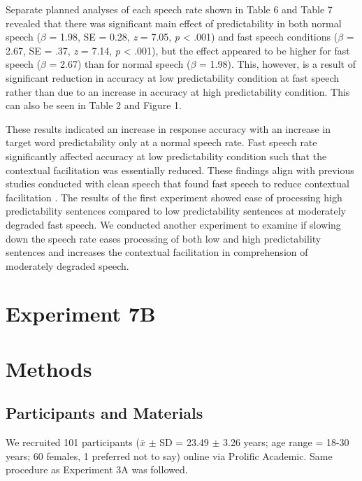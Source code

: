 \documentclass[a4paper, nobind]{templates/ociamthesis}
\begin{document}
Separate planned analyses of each speech rate shown in Table 6 and Table 7 revealed that there was significant main effect of predictability in both normal speech (\(\beta\) = 1.98, SE = 0.28, \emph{z} = 7.05, \emph{p} \textless{} .001) and fast speech conditions (\(\beta\) = 2.67, SE = .37, \emph{z} = 7.14, \emph{p} \textless{} .001),
but the effect appeared to be higher for fast speech (\(\beta\) = 2.67) than for normal speech (\(\beta\) = 1.98).
This, however, is a result of significant reduction in accuracy at low predictability condition at fast speech rather than due to an increase in accuracy at high predictability condition. This can also be seen in Table 2 and Figure 1.

These results indicated an increase in response accuracy with an increase in target word predictability only at a normal speech rate.
Fast speech rate significantly affected accuracy at low predictability condition such that the contextual facilitation was essentially reduced.
These findings align with previous studies conducted with clean speech that found fast speech to reduce contextual facilitation \autocite[e.g.,][]{Aydelott2004}.
The results of the first experiment showed ease of processing high predictability sentences compared to low predictability sentences at moderately degraded fast speech.
We conducted another experiment to examine if slowing down the speech rate eases processing of both low and high predictability sentences and increases the contextual facilitation in comprehension of moderately degraded speech.

\hypertarget{experiment-7b}{%
\section{Experiment 7B}\label{experiment-7b}}

\hypertarget{methods-4}{%
\section{Methods}\label{methods-4}}

\hypertarget{participants-and-materials-1}{%
\subsection{Participants and Materials}\label{participants-and-materials-1}}

We recruited 101 participants (\(\bar{x}\) \(\pm\) SD = 23.49 \(\pm\) 3.26 years; age range = 18-30 years; 60 females, 1 preferred not to say) online via Prolific Academic.
Same procedure as Experiment 3A was followed.
\end{document}
